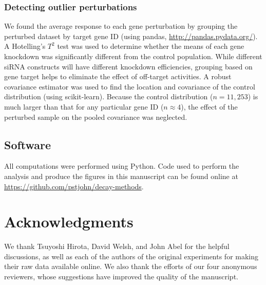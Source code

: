 \documentclass[11pt, letterpaper]{article}
\begin{document}
\subsubsection*{Detecting outlier perturbations}
We found the average response to each gene perturbation by grouping the perturbed dataset by target gene ID (using pandas, \url{http://pandas.pydata.org/}).
A Hotelling's $T^2$ test was used to determine whether the means of each gene knockdown was significantly different from the control population.
While different siRNA constructs will have different knockdown efficiencies, grouping based on gene target helps to eliminate the effect of off-target activities. 
A robust covariance estimator was used to find the location and covariance of the control distribution (using scikit-learn).
Because the control distribution ($n=11,253$) is much larger than that for any particular gene ID ($n \approx 4$), the effect of the perturbed sample on the pooled covariance was neglected.

\subsection*{Software}
All computations were performed using Python.
Code used to perform the analysis and produce the figures in this manuscript can be found online at \url{https://github.com/pstjohn/decay-methods}.






\section*{Acknowledgments}
We thank Tsuyoshi Hirota, David Welsh, and John Abel for the helpful discussions, as well as each of the authors of the original experiments for making their raw data available online.
We also thank the efforts of our four anonymous reviewers, whose suggestions have improved the quality of the manuscript.





\clearpage
\end{document}
